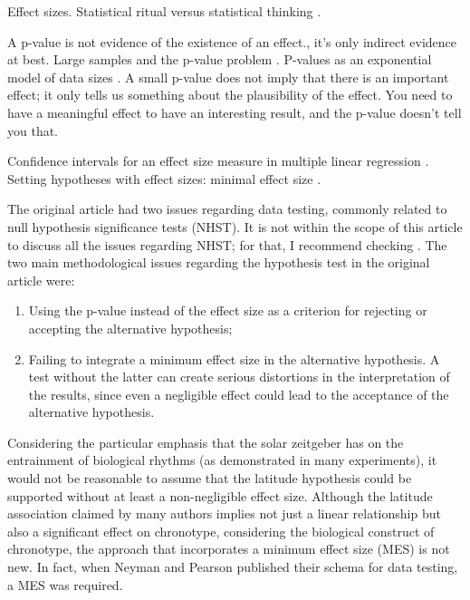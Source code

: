\documentclass[
12pt,
openright,
oneside,
a4paper,
chapter=TITLE,
section=TITLE,
french,
spanish,
brazil,
english
]{abntex2}\usepackage{array}
\begin{document}
Effect sizes. Statistical ritual versus statistical thinking
\autocite{gigerenzer2004}.

A p-value is not evidence of the existence of an effect., it's only
indirect evidence at best. Large samples and the p-value problem
\autocite{lin2013}. P-values as an exponential model of data sizes
\autocite{mariscal2021}. A small p-value does not imply that there is an
important effect; it only tells us something about the plausibility of
the effect. You need to have a meaningful effect to have an interesting
result, and the p-value doesn't tell you that.

Confidence intervals for an effect size measure in multiple linear
regression \autocite{algina2007}. Setting hypotheses with effect sizes:
minimal effect size \autocite{perezgonzalez2015}.

The original article had two issues regarding data testing, commonly
related to null hypothesis significance tests (NHST). It is not within
the scope of this article to discuss all the issues regarding NHST; for
that, I recommend checking \textcite{perezgonzalez2015}. The two main
methodological issues regarding the hypothesis test in the original
article were:

\begin{enumerate}
\def\labelenumi{\arabic{enumi}.}
\tightlist
\item
  Using the p-value instead of the effect size as a criterion for
  rejecting or accepting the alternative hypothesis;
\item
  Failing to integrate a minimum effect size in the alternative
  hypothesis. A test without the latter can create serious distortions
  in the interpretation of the results, since even a negligible effect
  could lead to the acceptance of the alternative hypothesis.
\end{enumerate}

Considering the particular emphasis that the solar zeitgeber has on the
entrainment of biological rhythms (as demonstrated in many experiments),
it would not be reasonable to assume that the latitude hypothesis could
be supported without at least a non-negligible effect size. Although the
latitude association claimed by many authors implies not just a linear
relationship but also a significant effect on chronotype, considering
the biological construct of chronotype, the approach that incorporates a
minimum effect size (MES) is not new. In fact, when Neyman and Pearson
published their schema for data testing, a MES was required.
\end{document}
